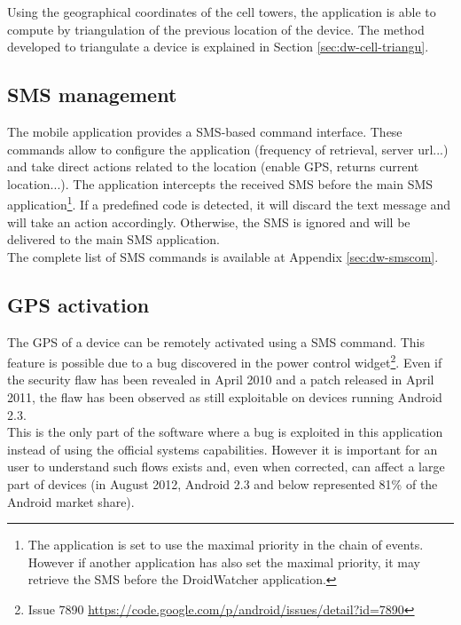 Using the geographical coordinates of the cell towers, the application is able to compute by triangulation of the previous location of the device.
The method developed to triangulate a device is explained in Section \ref{sec:dw-cell-triangu}.

\subsection{SMS management}
\label{sec:dw-sms-manag}

The mobile application provides a SMS-based command interface.
These commands allow to configure the application (frequency of retrieval, server url...) and take direct actions related to the location (enable GPS, returns current location...).
The application intercepts the received SMS before the main SMS application\footnote{The application is set to use the maximal priority in the chain of events. However if another application has also set the maximal priority, it may retrieve the SMS before the DroidWatcher application.}.
If a predefined code is detected, it will discard the text message and will take an action accordingly.
Otherwise, the SMS is ignored and will be delivered to the main SMS application.\\

The complete list of SMS commands is available at Appendix \ref{sec:dw-smscom}.

\subsection{GPS activation}
\label{sec:dw-gps-bug}

The GPS of a device can be remotely activated using a SMS command.
This feature is possible due to a bug discovered in the power control widget\footnote{Issue 7890 \url{https://code.google.com/p/android/issues/detail?id=7890}}.
Even if the security flaw has been revealed in April 2010 and a patch released in April 2011, the flaw has been observed as still exploitable on devices running Android 2.3.\\

This is the only part of the software where a bug is exploited in this application instead of using the official systems capabilities.
However it is important for an user to understand such flows exists and, even when corrected, can affect a large part of devices (in August 2012, Android 2.3 and below represented 81\% of the Android market share).


